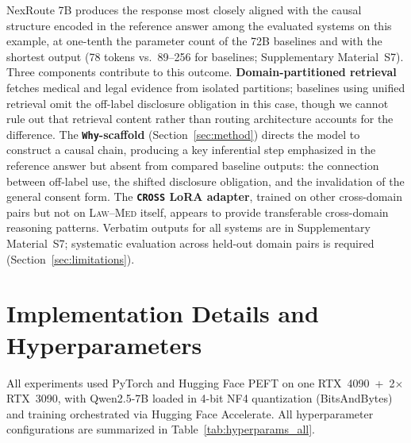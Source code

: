 \documentclass[a4paper,fleql,doubleblind]{cas-sc}
\begin{document}
NexRoute 7B produces the response most closely aligned with the causal structure
encoded in the reference answer among the evaluated systems on this example,
at one-tenth the parameter count of the 72B baselines and with the shortest output
(78 tokens vs.\ 89--256 for baselines; Supplementary Material~S7).
Three components contribute to this outcome.
\textbf{Domain-partitioned retrieval} fetches medical and legal evidence from
isolated partitions; baselines using unified retrieval omit the off-label
disclosure obligation in this case, though we cannot rule out that retrieval
content rather than routing architecture accounts for the difference.
The \textbf{\texttt{Why}-scaffold} (Section~\ref{sec:method}) directs the model
to construct a causal chain, producing a key inferential step emphasized in the
reference answer but absent from compared baseline outputs: the connection between
off-label use, the shifted disclosure obligation, and the invalidation of the
general consent form.
The \textbf{\texttt{CROSS} LoRA adapter}, trained on other cross-domain pairs
but not on \textsc{Law}--\textsc{Med} itself, appears to provide transferable
cross-domain reasoning patterns.
Verbatim outputs for all systems are in Supplementary Material~S7;
systematic evaluation across held-out domain pairs is required
(Section~\ref{sec:limitations}).

\section{Implementation Details and Hyperparameters}
\label{sec:implementation}
All experiments used PyTorch and Hugging Face PEFT on one RTX~4090\ +\ 2$\times$RTX~3090, with Qwen2.5-7B loaded in 4-bit NF4 quantization (BitsAndBytes) and training orchestrated via Hugging Face Accelerate. All hyperparameter configurations are summarized in Table~\ref{tab:hyperparams_all}.
\end{document}
